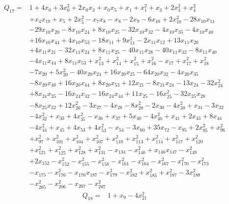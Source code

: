 \begin{equation*}\begin{aligned}
Q_{17}={}& 1+4x_{0}+3x_{0}^{2}+2x_{0}x_{3}+x_{0}x_{5}+x_{1}+x_{1}^{2}+x_{3}+2x_{3}^{2}+x_{4}^{2}\\
& +x_{4}x_{19}+x_{5}+2x_{5}^{2}-x_{7}x_{8}-x_{8}-2x_{9}-6x_{10}+2x_{10}^{2}-28x_{10}x_{11}\\
& -29x_{10}x_{20}-8x_{10}x_{24}+8x_{10}x_{25}-32x_{10}x_{32}-4x_{10}x_{35}-4x_{10}x_{40}\\
& +16x_{10}x_{44}+4x_{10}x_{53}-18x_{11}+9x_{11}^{2}-2x_{11}x_{12}+13x_{11}x_{20}\\
& +4x_{11}x_{21}-32x_{11}x_{24}+8x_{11}x_{25}-40x_{11}x_{28}-40x_{11}x_{32}-8x_{11}x_{40}\\
& -4x_{11}x_{44}+8x_{11}x_{53}+x_{13}^{2}+x_{14}^{2}+x_{15}^{2}+x_{16}^{2}-x_{17}+x_{17}^{2}+x_{18}^{2}\\
& -7x_{20}+5x_{20}^{2}-40x_{20}x_{24}+16x_{20}x_{25}-64x_{20}x_{32}-4x_{20}x_{35}\\
& -8x_{20}x_{40}+16x_{20}x_{44}+8x_{20}x_{53}+12x_{21}-8x_{21}x_{24}-13x_{24}-32x_{24}^{2}\\
& +8x_{24}x_{25}-16x_{24}x_{32}-16x_{24}x_{44}+11x_{25}-16x_{25}^{2}-32x_{25}x_{28}\\
& -8x_{25}x_{32}+12x_{26}^{2}-3x_{27}-4x_{28}-8x_{28}^{2}-2x_{30}-4x_{30}^{2}+x_{31}-3x_{32}\\
& -4x_{32}^{2}+x_{33}+4x_{35}^{2}-x_{36}+x_{37}+5x_{40}-4x_{40}^{2}+x_{41}+2x_{43}+8x_{44}\\
& -4x_{44}^{2}+x_{45}+4x_{53}+4x_{53}^{2}-x_{54}-3x_{60}+35x_{72}-x_{95}+2x_{95}^{2}+x_{96}^{2}\\
& +x_{97}^{2}+x_{101}^{2}+x_{104}^{2}+x_{107}^{2}+x_{110}^{2}+x_{113}^{2}+x_{114}^{2}+x_{117}^{2}+x_{120}^{2}\\
& +x_{121}^{2}+x_{125}^{2}+x_{128}^{2}+x_{131}^{2}-x_{134}-x_{140}^{2}+x_{146}x_{147}-x_{149}^{2}\\
& +2x_{152}-x_{152}^{2}-x_{155}^{2}-x_{158}^{2}-x_{161}^{2}-x_{164}^{2}-x_{167}^{2}-x_{170}^{2}-x_{173}^{2}\\
& -x_{175}-x_{176}^{2}-x_{176}x_{187}-x_{179}^{2}-x_{182}^{2}+x_{185}^{2}+x_{187}^{2}-3x_{188}^{2}\\
& -x_{205}^{2}-x_{206}^{2}-x_{207}-x_{207}^{2}
\end{aligned}\end{equation*}
\begin{equation*}\begin{aligned}
Q_{18}={}& 1+x_{9}-4x_{21}^{2}
\end{aligned}\end{equation*}
